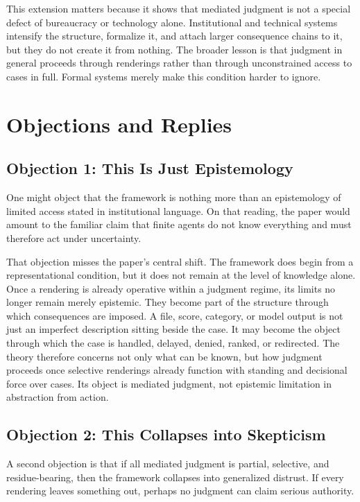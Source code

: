 \documentclass[11pt]{article}
\begin{document}
This extension matters because it shows that mediated judgment is not a special defect of bureaucracy or technology alone. Institutional and technical systems intensify the structure, formalize it, and attach larger consequence chains to it, but they do not create it from nothing. The broader lesson is that judgment in general proceeds through renderings rather than through unconstrained access to cases in full. Formal systems merely make this condition harder to ignore.\cite{Haraway1988SituatedKnowledges,Polanyi1966TacitDimension}
\section{Objections and Replies}

\subsection{Objection 1: This Is Just Epistemology}

One might object that the framework is nothing more than an epistemology of limited access stated in institutional language. On that reading, the paper would amount to the familiar claim that finite agents do not know everything and must therefore act under uncertainty.

That objection misses the paper's central shift. The framework does begin from a representational condition, but it does not remain at the level of knowledge alone. Once a rendering is already operative within a judgment regime, its limits no longer remain merely epistemic. They become part of the structure through which consequences are imposed. A file, score, category, or model output is not just an imperfect description sitting beside the case. It may become the object through which the case is handled, delayed, denied, ranked, or redirected. The theory therefore concerns not only what can be known, but how judgment proceeds once selective renderings already function with standing and decisional force over cases. Its object is mediated judgment, not epistemic limitation in abstraction from action.

\subsection{Objection 2: This Collapses into Skepticism}

A second objection is that if all mediated judgment is partial, selective, and residue-bearing, then the framework collapses into generalized distrust. If every rendering leaves something out, perhaps no judgment can claim serious authority.
\end{document}
